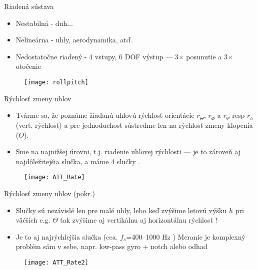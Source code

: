 \begin{frame}{Riadená sústava}
\begin{itemize}
  \item<1-> Nestabilná  - duh...
  \item<2-> Nelineárna  - uhly, aerodynamika, atď.
  \item<3-> Nedostatočne riadený  - 4 vstupy, 6 DOF výstup --- 3$\times$ posunutie a 3$\times$ otočenie \citep{Douglas2018}
\end{itemize}
\begin{figure}
\centering
  \texttt{[image: rollpitch]}\\
\end{figure}
\end{frame}

\begin{frame}[t]{Rýchlosť zmeny uhlov}
\begin{itemize}
  \item<1-> Tvárme sa, že poznáme žiadanú uhlovú rýchlosť orientácie $r_{\dot{\Theta}}$, $r_{\dot{\Phi}}$ a $r_{\dot{\Psi}}$ resp $r_{\dot{h}}$ (vert. rýchlosť) a pre jednoduchosť sústredme len na rýchlosť zmeny klopenia ($\dot{\Theta}$).
  \item<2-> Sme na najnižšej úrovni, t.j. riadenie uhlovej rýchlosti  --- je to zároveň aj najdôležitejšia slučka, a máme 4 slučky \citep{AP:PID,PX4:PIDTuning}.
  \end{itemize}

  \begin{figure}
\centering
  \texttt{[image: ATT\_Rate]}\\
\end{figure}
  \end{frame}

 
\begin{frame}[t]{Rýchlosť zmeny uhlov (pokr.)}
\begin{itemize}
  \item<1-> Slučky sú nezávislé len pre malé uhly, lebo keď zvýšime letovú výšku $h$ pri väčších e.g. $\Theta$ tak zvýšime aj vertikálnu aj horizontálnu rýchlosť \citep{Douglas2018}!
  \item<2->  Je to aj najrýchlejšia slučka (cca. $f_s$=400--1000 Hz \citep{AP:PID,PX4:PIDTuning}) Meranie je komplexný problém sám v sebe, napr. low-pass gyro + notch \citep{Bresciani2020} alebo odhad
  \end{itemize}
  \begin{figure}
\centering
  \texttt{[image: ATT\_Rate2]}\\
\end{figure}
  \end{frame}


